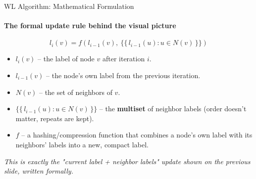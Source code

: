 \documentclass[aspectratio=169, 11pt]{beamer}
\begin{document}
\begin{frame}{WL Algorithm: Mathematical Formulation}
    \framesubtitle{The formal update rule behind the visual picture}

    \begin{center}
        \Large
        $$ l_i(v) = f\left(l_{i-1}(v),\ \{\!\{\, l_{i-1}(u) : u \in N(v) \,\}\!\}\right) $$
    \end{center}

    \vspace{0.2cm}
    \begin{itemize}
        \item $l_i(v)$ -- the label of node $v$ after iteration $i$.
        \item $l_{i-1}(v)$ -- the node's own label from the previous iteration.
        \item $N(v)$ -- the set of neighbors of $v$.
        \item $\{\!\{\, l_{i-1}(u) : u \in N(v) \,\}\!\}$ -- the \textbf{multiset}
        of neighbor labels (order doesn't matter, repeats are kept).
        \item $f$ -- a hashing/compression function that combines a node's own
        label with its neighbors' labels into a new, compact label.
    \end{itemize}

    \vspace{0.15cm}
    {\footnotesize\itshape This is exactly the "current label + neighbor
    labels" update shown on the previous slide, written formally.}
\end{frame}
\end{document}

